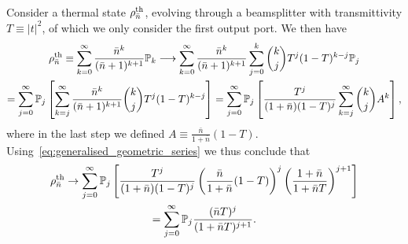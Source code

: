 \documentclass[12pt]{report}
\newcommand{\PP}{\mathbb{P}}
\begin{document}
\begin{prop}
	Consider a thermal state $\rho^{\rm th}_{\bar n}$, evolving through a beamsplitter with transmittivity $T\equiv |t|^2$, of which we only consider the first output port. We then have
	\begin{equation}
	\begin{gathered}
		\rho^{\rm th}_{\bar n}
		\equiv \sum_{k=0}^\infty \frac{\bar n^k}{(\bar n+1)^{k+1}}\PP_k
		\longrightarrow
		\sum_{k=0}^\infty \frac{\bar n^k}{(\bar n+1)^{k+1}}
		\sum_{j=0}^k \binom{k}{j} T^j (1-T)^{k-j} \PP_j \\
		= \sum_{j=0}^\infty \PP_j \left[
			\sum_{k=j}^\infty 
			\frac{\bar n^k}{(\bar n+1)^{k+1}}
			\binom{k}{j}
			T^j (1-T)^{k-j}
		\right]
		= \sum_{j=0}^\infty \PP_j \left[
			\frac{T^j}{(1+\bar n)(1-T)^j}
			\sum_{k=j}^\infty \binom{k}{j} A^k
		\right],
	\end{gathered}
	\end{equation}
	where in the last step we defined $A\equiv \frac{\bar n}{1+\bar n}(1-T)$.
	Using~\cref{eq:generalised_geometric_series} we thus conclude that
	\begin{equation}
	\begin{gathered}
		\rho^{\rm th}_{\bar n} \to
		\sum_{j=0}^\infty \PP_j
		\left[
			\frac{T^j}{(1+\bar n)(1-T)^j}
			\left(\frac{\bar n}{1+\bar n}(1-T)\right)^j
			\left(\frac{1+\bar n}{1+\bar n T}\right)^{j+1}
		\right] \\
		= \sum_{j=0}^\infty \PP_j
		\frac{(\bar n T)^j}{(1+\bar nT)^{j+1}}.
	\end{gathered}
	\end{equation}
\end{prop}
\end{document}
